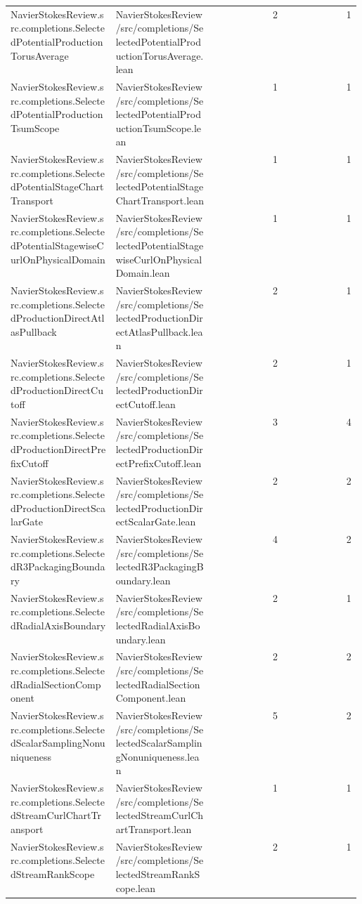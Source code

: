 \begin{longtable}{p{0.30\linewidth}p{0.28\linewidth}rr}
NavierStokesReview.src.completions.SelectedPotentialProductionTorusAverage & NavierStokesReview/src/completions/SelectedPotentialProductionTorusAverage.lean & 2 & 1\\
NavierStokesReview.src.completions.SelectedPotentialProductionTsumScope & NavierStokesReview/src/completions/SelectedPotentialProductionTsumScope.lean & 1 & 1\\
NavierStokesReview.src.completions.SelectedPotentialStageChartTransport & NavierStokesReview/src/completions/SelectedPotentialStageChartTransport.lean & 1 & 1\\
NavierStokesReview.src.completions.SelectedPotentialStagewiseCurlOnPhysicalDomain & NavierStokesReview/src/completions/SelectedPotentialStagewiseCurlOnPhysicalDomain.lean & 1 & 1\\
NavierStokesReview.src.completions.SelectedProductionDirectAtlasPullback & NavierStokesReview/src/completions/SelectedProductionDirectAtlasPullback.lean & 2 & 1\\
NavierStokesReview.src.completions.SelectedProductionDirectCutoff & NavierStokesReview/src/completions/SelectedProductionDirectCutoff.lean & 2 & 1\\
NavierStokesReview.src.completions.SelectedProductionDirectPrefixCutoff & NavierStokesReview/src/completions/SelectedProductionDirectPrefixCutoff.lean & 3 & 4\\
NavierStokesReview.src.completions.SelectedProductionDirectScalarGate & NavierStokesReview/src/completions/SelectedProductionDirectScalarGate.lean & 2 & 2\\
NavierStokesReview.src.completions.SelectedR3PackagingBoundary & NavierStokesReview/src/completions/SelectedR3PackagingBoundary.lean & 4 & 2\\
NavierStokesReview.src.completions.SelectedRadialAxisBoundary & NavierStokesReview/src/completions/SelectedRadialAxisBoundary.lean & 2 & 1\\
NavierStokesReview.src.completions.SelectedRadialSectionComponent & NavierStokesReview/src/completions/SelectedRadialSectionComponent.lean & 2 & 2\\
NavierStokesReview.src.completions.SelectedScalarSamplingNonuniqueness & NavierStokesReview/src/completions/SelectedScalarSamplingNonuniqueness.lean & 5 & 2\\
NavierStokesReview.src.completions.SelectedStreamCurlChartTransport & NavierStokesReview/src/completions/SelectedStreamCurlChartTransport.lean & 1 & 1\\
NavierStokesReview.src.completions.SelectedStreamRankScope & NavierStokesReview/src/completions/SelectedStreamRankScope.lean & 2 & 1\\

\end{longtable}
